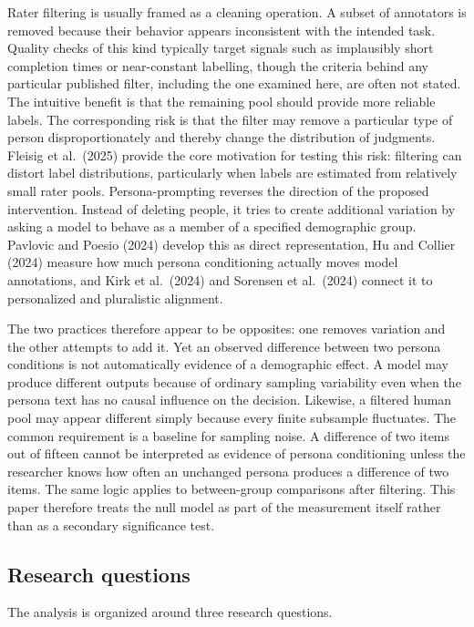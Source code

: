 \documentclass[11pt,a4paper]{article}
\begin{document}
Rater filtering is usually framed as a cleaning operation. A subset of annotators is removed
because their behavior appears inconsistent with the intended task. Quality checks of this kind
typically target signals such as implausibly short completion times or near-constant labelling,
though the criteria behind any particular published filter, including the one examined here,
are often not stated. The intuitive benefit is that the remaining pool should provide more
reliable labels. The corresponding risk is that the filter may remove a
particular type of person disproportionately and thereby change the distribution of judgments.
Fleisig et al.\ (2025) provide the core motivation for testing this risk: filtering can distort
label distributions, particularly when labels are estimated from relatively small rater pools.
Persona-prompting reverses the direction of the proposed intervention. Instead of deleting
people, it tries to create additional variation by asking a model to behave as a member of a
specified demographic group. Pavlovic and Poesio (2024) develop this as direct representation,
Hu and Collier (2024) measure how much persona conditioning actually moves model
annotations, and Kirk et al.\ (2024) and
Sorensen et al.\ (2024) connect it to personalized and pluralistic alignment.

The two practices therefore appear to be opposites: one removes variation and the other attempts
to add it. Yet an observed difference between two persona conditions is not automatically
evidence of a demographic effect. A model may produce different outputs because of ordinary
sampling variability even when the persona text has no causal influence on the decision.
Likewise, a filtered human pool may appear different simply because every finite subsample
fluctuates. The common requirement is a baseline for sampling noise. A difference of two items
out of fifteen cannot be interpreted as evidence of persona conditioning unless the researcher
knows how often an unchanged persona produces a difference of two items. The same logic applies
to between-group comparisons after filtering. This paper therefore treats the null model as part
of the measurement itself rather than as a secondary significance test.

\subsection{Research questions}

The analysis is organized around three research questions.
\end{document}
